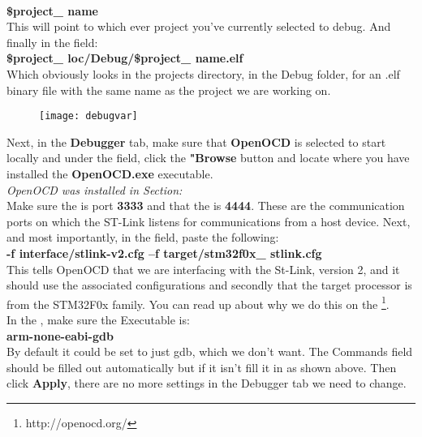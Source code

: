 {\\
\textbf{\color{Green} \${project\_ name}}
\\
This will point to which ever project you've currently selected to debug. And finally in the \underline{} field:
\\
\textbf{\color{Green} \${project\_ loc}/Debug/\${project\_ name}.elf}
\\
Which obviously looks in the projects directory, in the Debug folder, for an .elf binary file with the same name as the project we are working on. 
\begin{figure}[hbtp]
\centering
\texttt{[image: debugvar]}
\end{figure}
\raggedright
Next, in the \textbf{\color{Aquamarine} Debugger} tab, make sure that \textbf{\color{Orange} OpenOCD} is selected to start locally and under the \underline{} field, click the \textbf{\color{Purple} "Browse} button and locate where you have installed the \textbf{\color{Orange} OpenOCD.exe} executable.
\\
\emph{\color{Gray} OpenOCD was installed in Section: \cite{Inst:OpenOCD}}
\\
Make sure the \underline{} is port \textbf{3333} and that the \underline{} is \textbf{4444}. These are the communication ports on which the ST-Link listens for communications from a host device. Next, and most importantly, in the \underline{} field, paste the following:
\\
\centering
\textbf{\color{Green} -f interface/stlink-v2.cfg –f target/stm32f0x\_ stlink.cfg}
\\
\justifying
This tells OpenOCD that we are interfacing with the St-Link, version 2, and it should use the associated configurations and secondly that the target processor is from the STM32F0x family. You can read up about why we do this on the \href{http://openocd.org/}{\underline{}}\footnote{http://openocd.org/}.
\\
In the \underline{}, make sure the Executable is:
\\
\textbf{\color{Green} arm-none-eabi-gdb}
\\
By default it could be set to just gdb, which we don't want. The Commands field should be filled out automatically but if it isn't fill it in as shown above. Then click \textbf{\color{Purple} Apply}, there are no more settings in the Debugger tab we need to change.
}
